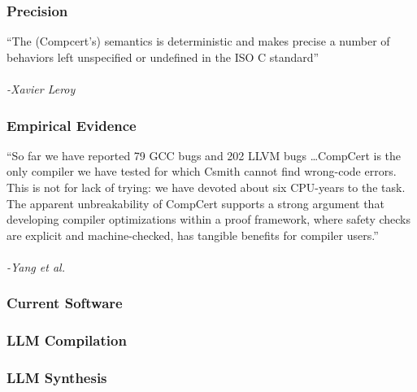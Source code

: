 \documentclass[usenames,dvipsnames]{beamer}
\begin{document}
\begin{frame}
\frametitle{Precision}
``The (Compcert's) semantics is deterministic and makes precise a number of behaviors left
unspeciﬁed or undeﬁned in the ISO C standard''
\\
\hspace{1em}
\\
\textit{-Xavier Leroy}\supercite{leroy}
\end{frame}

\begin{frame}
\frametitle{Empirical Evidence}
``So far we have reported 79 GCC bugs and 202 LLVM bugs \dots CompCert is the
only compiler we have tested for which Csmith cannot ﬁnd wrong-code errors. This
is not for lack of trying: we have devoted about six CPU-years to the task. The
apparent unbreakability of CompCert supports a strong argument that developing
compiler optimizations within a proof framework, where safety checks are
explicit and machine-checked, has tangible beneﬁts for compiler users.''
\\
\hspace{1em}
\\
\textit{-Yang et al.}\supercite{yang}
\end{frame}

\begin{frame}[fragile]
\frametitle{Current Software}
\end{frame}

\begin{frame}
\frametitle{LLM Compilation}
\end{frame}

\begin{frame}
\frametitle{LLM Synthesis}
\end{frame}
\end{document}
